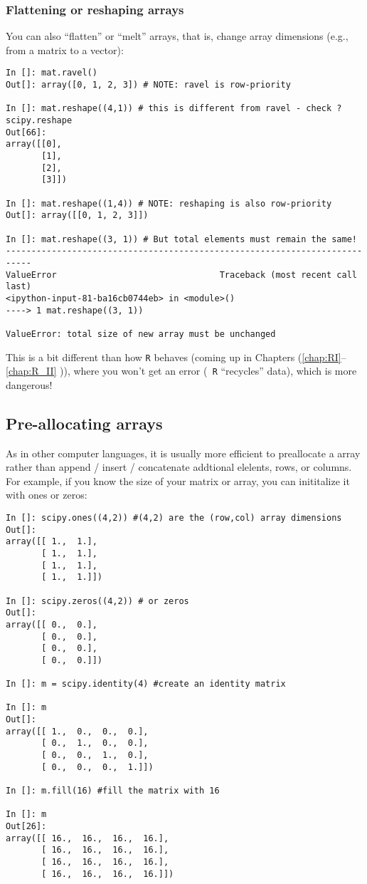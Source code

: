 \subsubsection{Flattening or reshaping arrays} 
You can also ``flatten'' or ``melt'' arrays, that is, change array 
dimensions (e.g., from a matrix to a vector):
\begin{lstlisting}
In []: mat.ravel()
Out[]: array([0, 1, 2, 3]) # NOTE: ravel is row-priority

In []: mat.reshape((4,1)) # this is different from ravel - check ?scipy.reshape
Out[66]: 
array([[0],
       [1],
       [2],
       [3]])

In []: mat.reshape((1,4)) # NOTE: reshaping is also row-priority
Out[]: array([[0, 1, 2, 3]])

In []: mat.reshape((3, 1)) # But total elements must remain the same!
---------------------------------------------------------------------------
ValueError                                Traceback (most recent call last)
<ipython-input-81-ba16cb0744eb> in <module>()
----> 1 mat.reshape((3, 1))

ValueError: total size of new array must be unchanged
\end{lstlisting}
This is a bit different than how {\tt R} behaves (coming up in Chapters 
(\ref{chap:RI}--\ref{chap:R_II} )), where you won't get an error ({\tt 
R} ``recycles'' data), which is more dangerous!

\subsection{Pre-allocating arrays}
As in other computer languages, it is usually more efficient to 
preallocate a array rather than append / insert / concatenate addtional 
elelents, rows, or columns. For example, if you know the size of your 
matrix or array, you can inititalize it with ones or zeros:

\begin{lstlisting}
In []: scipy.ones((4,2)) #(4,2) are the (row,col) array dimensions
Out[]: 
array([[ 1.,  1.],
       [ 1.,  1.],
       [ 1.,  1.],
       [ 1.,  1.]])

In []: scipy.zeros((4,2)) # or zeros
Out[]: 
array([[ 0.,  0.],
       [ 0.,  0.],
       [ 0.,  0.],
       [ 0.,  0.]])

In []: m = scipy.identity(4) #create an identity matrix

In []: m
Out[]: 
array([[ 1.,  0.,  0.,  0.],
       [ 0.,  1.,  0.,  0.],
       [ 0.,  0.,  1.,  0.],
       [ 0.,  0.,  0.,  1.]])

In []: m.fill(16) #fill the matrix with 16

In []: m
Out[26]: 
array([[ 16.,  16.,  16.,  16.],
       [ 16.,  16.,  16.,  16.],
       [ 16.,  16.,  16.,  16.],
       [ 16.,  16.,  16.,  16.]])
\end{lstlisting}

